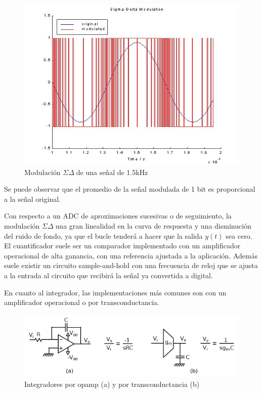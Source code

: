 \documentclass[12pt]{report} %
\newcommand{\sigmadelta}{$\Sigma\Delta\; $}
\begin{document}
	\begin{figure}[H]
		\includegraphics[width=\textwidth]{sd-modulation-example.jpg}
		\caption[Modulación \sigmadelta de una señal de 1.5kHz]{Modulación \sigmadelta de una señal de 1.5kHz\protect\footnotemark}
		\label{fig:sd-modulation-example.jpg}
	\end{figure}

	
	Se puede observar que el promedio de la señal modulada de 1 bit es proporcional a la señal original.
	
	Con respecto a un ADC de aproximaciones sucesivas o de seguimiento, la modulación \sigmadelta una gran linealidad en la curva de respuesta y una disminución del ruido de fondo, ya que el bucle tenderá a hacer que la salida \begin{math} y(t) \end{math} sea cero. El cuantificador suele ser un comparador implementado con un amplificador operacional de alta ganancia, con una referencia ajustada a la aplicación. Además suele existir un circuito sample-and-hold con una frecuencia de reloj que se ajusta a la entrada al circuito que recibirá la señal ya convertida a digital.
	
	En cuanto al integrador, las implementaciones más comunes son con un amplificador operacional o por transconductancia.
	
	\begin{figure}[H]
		\includegraphics[width=\textwidth]{integrator-opamp-trans.png}
		\caption[Integradores por opamp (a) y por transconductancia (b)]{Integradores por opamp (a) y por transconductancia (b)\protect\footnotemark}
		\label{fig:integrator-opamp-trans.png}
	\end{figure}
	
\end{document}
